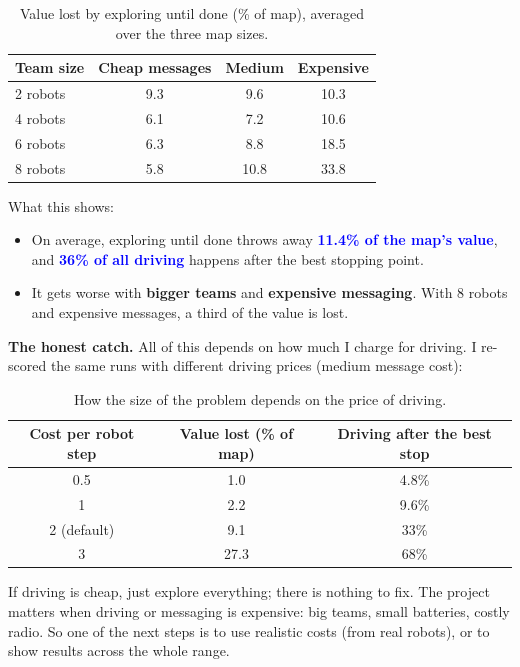 \documentclass[11pt,a4paper]{article}
\newcommand{\key}[1]{\textcolor{blue}{\textbf{#1}}}
\begin{document}
\begin{table}[h]
\centering
\small
\begin{tabular}{lccc}
\toprule
Team size & Cheap messages & Medium & Expensive \\
\midrule
2 robots & 9.3 & 9.6 & 10.3 \\
4 robots & 6.1 & 7.2 & 10.6 \\
6 robots & 6.3 & 8.8 & 18.5 \\
8 robots & 5.8 & 10.8 & 33.8 \\
\bottomrule
\end{tabular}
\caption{Value lost by exploring until done (\% of map), averaged over the three map sizes.}
\label{tab:stageA}
\end{table}

What this shows:
\begin{itemize}
  \item On average, exploring until done throws away \key{11.4\% of the map's value}, and \key{36\% of all driving} happens after the best stopping point.
  \item It gets worse with \textbf{bigger teams} and \textbf{expensive messaging}. With 8 robots and expensive messages, a third of the value is lost.
\end{itemize}

\textbf{The honest catch.} All of this depends on how much I charge for driving. I re-scored the same runs with different driving prices (medium message cost):

\begin{table}[h]
\centering
\small
\begin{tabular}{ccc}
\toprule
Cost per robot step & Value lost (\% of map) & Driving after the best stop \\
\midrule
0.5 & 1.0 & 4.8\% \\
1 & 2.2 & 9.6\% \\
2 (default) & 9.1 & 33\% \\
3 & 27.3 & 68\% \\
\bottomrule
\end{tabular}
\caption{How the size of the problem depends on the price of driving.}
\label{tab:sens}
\end{table}

If driving is cheap, just explore everything; there is nothing to fix. The project matters when driving or messaging is expensive: big teams, small batteries, costly radio. So one of the next steps is to use realistic costs (from real robots), or to show results across the whole range.
\end{document}
